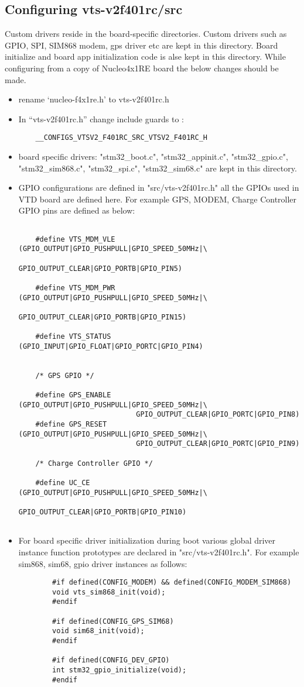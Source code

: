 \subsection*{Configuring vts-v2f401rc/src}
Custom drivers reside in the board-specific directories. Custom drivers such as GPIO, SPI, SIM868 modem, gps driver etc are kept in this directory. Board initialize and board app initialization code is alse kept in this directory. While configuring from a copy of Nucleo4x1RE board the below changes should be made.
\begin{itemize}
	\item rename ‘nucleo-f4x1re.h’ to vts-v2f401rc.h
	\item In “vts-v2f401rc.h” change include guards to :
	\begin{verbatim}
	__CONFIGS_VTSV2_F401RC_SRC_VTSV2_F401RC_H
	\end{verbatim}
	\item board specific drivers: "stm32{\_}boot.c", "stm32{\_}appinit.c", "stm32{\_}gpio.c", "stm32{\_}sim868.c", "stm32{\_}spi.c", "stm32{\_}sim68.c" are kept in this directory.
	\item GPIO configurations are defined in "src/vts-v2f401rc.h" all the GPIOs used in VTD board are defined here. For example GPS, MODEM, Charge Controller GPIO pins are defined as below:
	\begin{verbatim}
	
	#define VTS_MDM_VLE		(GPIO_OUTPUT|GPIO_PUSHPULL|GPIO_SPEED_50MHz|\
								GPIO_OUTPUT_CLEAR|GPIO_PORTB|GPIO_PIN5)
	
	#define VTS_MDM_PWR	(GPIO_OUTPUT|GPIO_PUSHPULL|GPIO_SPEED_50MHz|\
							GPIO_OUTPUT_CLEAR|GPIO_PORTB|GPIO_PIN15)
	
	#define VTS_STATUS		(GPIO_INPUT|GPIO_FLOAT|GPIO_PORTC|GPIO_PIN4)
	
	
	/* GPS GPIO */
	
	#define GPS_ENABLE  (GPIO_OUTPUT|GPIO_PUSHPULL|GPIO_SPEED_50MHz|\
							GPIO_OUTPUT_CLEAR|GPIO_PORTC|GPIO_PIN8)
	#define GPS_RESET   (GPIO_OUTPUT|GPIO_PUSHPULL|GPIO_SPEED_50MHz|\
							GPIO_OUTPUT_CLEAR|GPIO_PORTC|GPIO_PIN9)
	
	/* Charge Controller GPIO */
	
	#define UC_CE		(GPIO_OUTPUT|GPIO_PUSHPULL|GPIO_SPEED_50MHz|\
							GPIO_OUTPUT_CLEAR|GPIO_PORTB|GPIO_PIN10)
	
	\end{verbatim}
	\item For board specific driver initialization during boot various global driver instance function prototypes are declared in "src/vts-v2f401rc.h". For example sim868, sim68, gpio driver instances as follows:
	\begin{verbatim}
		#if defined(CONFIG_MODEM) && defined(CONFIG_MODEM_SIM868)
		void vts_sim868_init(void);
		#endif
		
		#if defined(CONFIG_GPS_SIM68)
		void sim68_init(void);
		#endif
		
		#if defined(CONFIG_DEV_GPIO)
		int stm32_gpio_initialize(void);
		#endif
	\end{verbatim}
\end{itemize}


